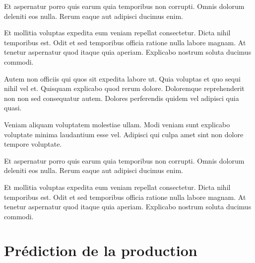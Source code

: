 \documentclass[a4paper]{article}
\begin{document}
\begin{multicols}{2}
Et aspernatur porro quis earum quia temporibus non corrupti. Omnis dolorum
    deleniti eos nulla. Rerum eaque aut adipisci ducimus enim.

Et mollitia voluptas expedita eum veniam repellat consectetur. Dicta nihil
    temporibus est. Odit et sed temporibus officia ratione nulla labore magnam.
    At tenetur aspernatur quod itaque quia aperiam. Explicabo nostrum soluta
    ducimus commodi.

Autem non officiis qui quos sit expedita labore ut. Quia voluptas et quo sequi
nihil vel et. Quisquam explicabo quod rerum dolore. Doloremque reprehenderit non
non sed consequatur autem. Dolores perferendis quidem vel adipisci quia quasi.

Veniam aliquam voluptatem molestiae ullam. Modi veniam sunt explicabo voluptate
minima laudantium esse vel. Adipisci qui culpa amet sint non dolore tempore
voluptate.

Et aspernatur porro quis earum quia temporibus non corrupti. Omnis dolorum
    deleniti eos nulla. Rerum eaque aut adipisci ducimus enim.

Et mollitia voluptas expedita eum veniam repellat consectetur. Dicta nihil
    temporibus est. Odit et sed temporibus officia ratione nulla labore magnam.
    At tenetur aspernatur quod itaque quia aperiam. Explicabo nostrum soluta
    ducimus commodi.



\end{multicols}

\clearpage

\section{Prédiction de la production}
\end{document}
